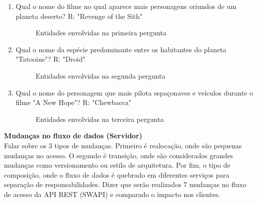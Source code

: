 \begin{enumerate}
\item Qual o nome do filme no qual aparece mais personagens oriundos de um planeta deserto? R: "Revenge of the Sith"

\begin{figure}[H]
  \centering
  \caption{Entidades envolvidas na primeira pergunta}
\end{figure}

\item Qual o nome da espécie predominante entre os habitantes do planeta "Tatooine"? R: "Droid"

\begin{figure}[H]
  \centering
  \caption{Entidades envolvidas na segunda pergunta}
\end{figure}

\item Qual o nome do personagem que mais pilota espaçonaves e veículos durante o filme "A New Hope"? R: "Chewbacca"

\begin{figure}[H]
  \centering
  \caption{Entidades envolvidas na terceira pergunta}
\end{figure}

\end{enumerate}

\textbf{Mudanças no fluxo de dados (Servidor)} \\

Falar sobre os 3 tipos de mudanças. Primeiro é realocação, onde são pequenas mudanças no acesso. O segundo é transição, onde são considerados grandes mudanças como versionamento ou estilo de arquitetura. Por fim, o tipo de composição, onde o fluxo de dados é quebrado em diferentes serviços para separação de responsabilidades. Dizer que serão realizados 7 mudanças no fluxo de acesso da API REST (SWAPI) e comparado o impacto nos clientes.

